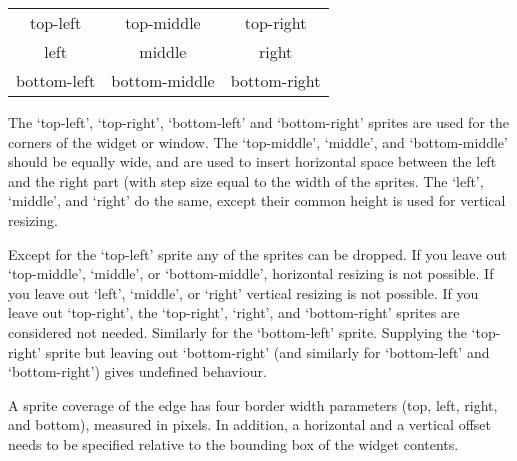 \documentclass{article}
\begin{document}
\smallskip
\begin{center}
\begin{tabular}{ccc}
top-left    & top-middle    & top-right \\
left        & middle        & right \\
bottom-left & bottom-middle & bottom-right
\end{tabular}
\end{center}

The `top-left', `top-right', `bottom-left' and `bottom-right' sprites are used
for the corners of the widget or window. The `top-middle', `middle', and
`bottom-middle' should be equally wide, and are used to insert horizontal
space between the left and the right part (with step size equal to the width
of the sprites. The `left', `middle', and `right' do the same, except their
common height is used for vertical resizing.

Except for the `top-left' sprite any of the sprites can be dropped. If you leave out
`top-middle', `middle', or `bottom-middle', horizontal resizing is not
possible. If you leave out `left', `middle', or `right' vertical resizing is
not possible.
If you leave out `top-right', the `top-right', `right', and `bottom-right'
sprites are considered not needed. Similarly for the `bottom-left' sprite.
Supplying the `top-right' sprite but leaving out `bottom-right' (and similarly
for `bottom-left' and `bottom-right') gives undefined behaviour.

A sprite coverage of the edge has four border width parameters (top, left,
right, and bottom), measured in pixels.
In addition, a horizontal and a vertical
offset needs to be specified relative to the bounding box of the widget
contents.
\end{document}
